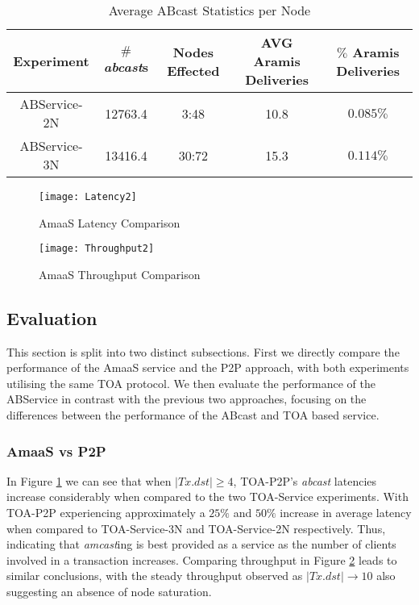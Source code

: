 	\begin{table}[h]
	  \begin{center}
	    \begin{tabular}{|c|c|c|c|c|}
	    \hline
	    Experiment  & $\#$ \emph{abcast}s & Nodes Effected &  AVG Aramis Deliveries & $\%$ Aramis Deliveries \\ \hline \hline
	    ABService-2N & 12763.4 & 3:48   & 10.8  & $0.085\%$  \\ \hline
	    ABService-3N & 13416.4 & 30:72 & 15.3  & $0.114\%$ \\ \hline
	    \end{tabular}
	    \caption{Average ABcast Statistics per Node}
	    \label{table:emulated_transcation_aramis_deliveries}
	  \end{center}
	\end{table}	
	
	\begin{figure}[tp]
	 \texttt{[image: Latency2]}
	 \caption{AmaaS Latency Comparison}
	 \label{fig:LatencyGraph}
	\end{figure}
	
	\begin{figure}[bp]
	 \texttt{[image: Throughput2]}
	 \caption{AmaaS Throughput Comparison}
	 \label{fig:ThroughputGraph}
	\end{figure}	
	
	\clearpage
    \subsection{Evaluation}
    This section is split into two distinct subsections.  First we directly compare the performance of the \textsf{AmaaS} service and the P2P approach, with both experiments utilising the same TOA protocol.  We then evaluate the performance of the ABService in contrast with the previous two approaches, focusing on the differences between the performance of the ABcast and TOA based service.  
    
    \subsubsection*{AmaaS vs P2P}
	In Figure \ref{fig:LatencyGraph} we can see that when $|Tx.dst| \geq 4$, TOA-P2P's \emph{abcast} latencies increase considerably when compared to the two TOA-Service experiments.  With TOA-P2P experiencing approximately a $25\%$ and $50\%$ increase in average latency when compared to TOA-Service-3N and TOA-Service-2N respectively.  Thus, indicating that \emph{amcast}ing is best provided as a service as the number of clients involved in a transaction increases. Comparing throughput in Figure \ref{fig:ThroughputGraph} leads to similar conclusions, with the steady throughput observed as $|Tx.dst| \rightarrow 10$ also suggesting an absence of node saturation.  
	

